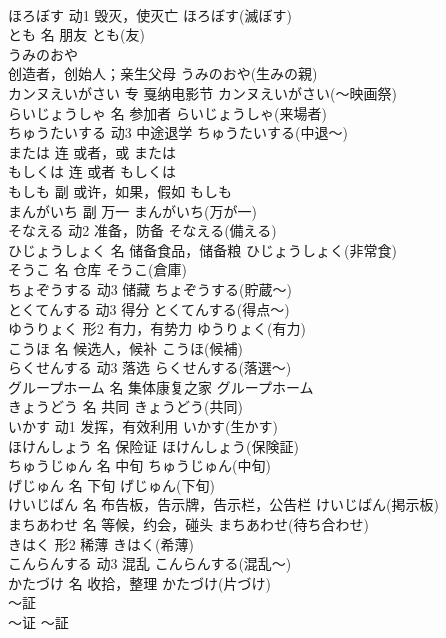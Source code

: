 \documentclass[8pt]{extreport}
\begin{document}
\begin{CJK}{UTF8}{min}
\\	ほろぼす	动1	毁灭，使灭亡	ほろぼす(滅ぼす)	
\\	とも	名	朋友	とも(友)	
\\	うみのおや	
\\	创造者，创始人；亲生父母	うみのおや(生みの親)	
\\	カンヌえいがさい	专	戛纳电影节	カンヌえいがさい(～映画祭)	
\\	らいじょうしゃ	名	参加者	らいじょうしゃ(来場者)	
\\	ちゅうたいする	动3	中途退学	ちゅうたいする(中退～)	
\\	または	连	或者，或	または	
\\	もしくは	连	或者	もしくは	
\\	もしも	副	或许，如果，假如	もしも	
\\	まんがいち	副	万一	まんがいち(万が一)	
\\	そなえる	动2	准备，防备	そなえる(備える)	
\\	ひじょうしょく	名	储备食品，储备粮	ひじょうしょく(非常食)	
\\	そうこ	名	仓库	そうこ(倉庫)	
\\	ちょぞうする	动3	储藏	ちょぞうする(貯蔵～)	
\\	とくてんする	动3	得分	とくてんする(得点～)	
\\	ゆうりょく	形2	有力，有势力	ゆうりょく(有力)	
\\	こうほ	名	候选人，候补	こうほ(候補)	
\\	らくせんする	动3	落选	らくせんする(落選～)	
\\	グループホーム	名	集体康复之家	グループホーム	
\\	きょうどう	名	共同	きょうどう(共同)	
\\	いかす	动1	发挥，有效利用	いかす(生かす)	
\\	ほけんしょう	名	保险证	ほけんしょう(保険証)	
\\	ちゅうじゅん	名	中旬	ちゅうじゅん(中旬)	
\\	げじゅん	名	下旬	げじゅん(下旬)	
\\	けいじばん	名	布告板，告示牌，告示栏，公告栏	けいじばん(掲示板)	
\\	まちあわせ	名	等候，约会，碰头	まちあわせ(待ち合わせ)	
\\	きはく	形2	稀薄	きはく(希薄)	
\\	こんらんする	动3	混乱	こんらんする(混乱～)	
\\	かたづけ	名	收拾，整理	かたづけ(片づけ)	
\\	～証	
\\	～证	～証	

\end{CJK}
\end{document}
